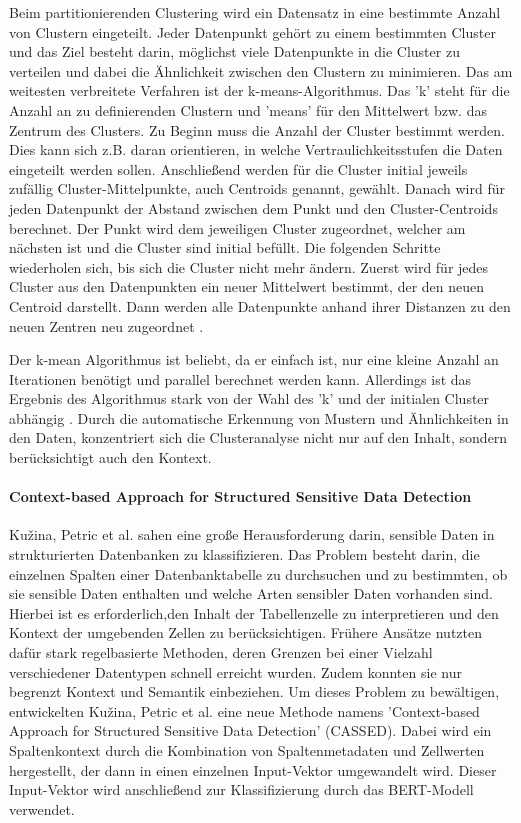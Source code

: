 Beim partitionierenden Clustering wird ein Datensatz in eine bestimmte Anzahl von Clustern eingeteilt. Jeder Datenpunkt gehört zu einem bestimmten Cluster und das Ziel besteht darin, möglichst viele Datenpunkte in die Cluster zu verteilen und dabei die Ähnlichkeit zwischen den Clustern zu minimieren. Das am weitesten verbreitete Verfahren ist der k-means-Algorithmus. Das 'k' steht für die Anzahl an zu definierenden Clustern und 'means' für den Mittelwert bzw. das Zentrum des Clusters. Zu Beginn muss die Anzahl der Cluster bestimmt werden. Dies kann sich z.B. daran orientieren, in welche Vertraulichkeitsstufen die Daten eingeteilt werden sollen. Anschließend werden für die Cluster initial jeweils zufällig Cluster-Mittelpunkte, auch Centroids genannt, gewählt. Danach wird für jeden Datenpunkt der Abstand zwischen dem Punkt und den Cluster-Centroids berechnet. Der Punkt wird dem jeweiligen Cluster zugeordnet, welcher am nächsten ist und die Cluster sind initial befüllt. Die folgenden Schritte wiederholen sich, bis sich die Cluster nicht mehr ändern. Zuerst wird für jedes Cluster aus den Datenpunkten ein neuer Mittelwert bestimmt, der den neuen Centroid darstellt. Dann werden alle Datenpunkte anhand ihrer Distanzen zu den neuen Zentren neu zugeordnet \cite{Suyal.2014}.

Der k-mean Algorithmus ist beliebt, da er einfach ist, nur eine kleine Anzahl an Iterationen benötigt und parallel berechnet werden kann. Allerdings ist das Ergebnis des Algorithmus stark von der Wahl des 'k' und der initialen Cluster abhängig \cite{Suyal.2014}.
Durch die automatische Erkennung von Mustern und Ähnlichkeiten in den Daten, konzentriert sich die Clusteranalyse nicht nur auf den Inhalt, sondern berücksichtigt auch den Kontext.

\paragraph{Context-based Approach for Structured Sensitive Data Detection}
Kužina, Petric et al. \cite{Kuzina.2023} sahen eine große Herausforderung darin, sensible Daten in strukturierten Datenbanken zu klassifizieren. Das Problem besteht darin, die einzelnen Spalten einer Datenbanktabelle zu durchsuchen und zu bestimmten, ob sie sensible Daten enthalten und welche Arten sensibler Daten vorhanden sind. Hierbei ist es erforderlich,den Inhalt der Tabellenzelle zu interpretieren und den Kontext der umgebenden Zellen zu berücksichtigen. Frühere Ansätze nutzten dafür stark regelbasierte Methoden, deren Grenzen bei einer Vielzahl verschiedener Datentypen schnell erreicht wurden. Zudem konnten sie nur begrenzt Kontext und Semantik einbeziehen. Um dieses Problem zu bewältigen, entwickelten
Kužina, Petric et al. \cite{Kuzina.2023} eine neue Methode namens 'Context-based Approach for Structured Sensitive Data Detection' (CASSED). Dabei wird ein Spaltenkontext durch die Kombination von Spaltenmetadaten und Zellwerten hergestellt, der dann in einen einzelnen Input-Vektor umgewandelt wird. Dieser Input-Vektor wird anschließend zur Klassifizierung durch das BERT-Modell verwendet.

